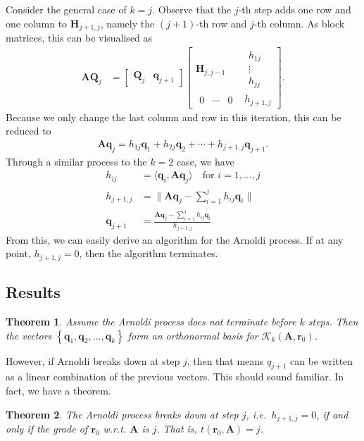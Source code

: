 \documentclass[12pt,a4paper]{article} %
\newtheorem*{theorem}{Theorem}
\begin{document}
Consider the general case of $k=j$. Observe that the $j$-th step adds 
one row and one column to $\mathbf H_{j+1,j}$, namely the $(j+1)$-th row and $j$-th 
column. As block matrices, this can be visualised as 
\begin{align*}
    \mathbf A \mathbf Q_j &= \begin{bmatrix}
        \mathbf Q_j & \bm q_{j+1}
    \end{bmatrix}
    \begin{bmatrix}
        \mathbf H_{j,j-1} & \begin{matrix}
            h_{1j} \\ \vdots \\ h_{jj}
        \end{matrix} \\ 
        \begin{matrix}
            0 & \cdots & 0
        \end{matrix} & h_{j+1,j}
    \end{bmatrix}.
\end{align*}
Because we only change the last column and row in this iteration, this can be reduced to 
\begin{align*}
    \mathbf A \bm q_j = h_{1j}\bm q_1 + h_{2j} \bm q_2 + \cdots + h_{j+1,j}\bm q_{j+1}.
\end{align*}
Through a similar process to the $k=2$ case, we have 
\begin{align*}
    h_{ij} &= \langle \bm q_i, \mathbf A\bm q_j \rangle \quad \text{for } i=1, \ldots, j \\ 
    h_{j+1,j} &= \| \mathbf A \bm q_j - \textstyle\sum_{i=1}^j h_{ij} \bm q_i \| \\ 
    \bm q_{j+1} &= \frac{\mathbf A \bm q_j - \sum_{i=1}^j h_{ij} \bm q_i }{h_{j+1,j}}
\end{align*}
From this, we can easily derive an algorithm for the Arnoldi process.
If at any point, $h_{j+1,j} = 0$, then the algorithm terminates. 

\subsection{Results}
\begin{theorem}
    Assume the Arnoldi process does not terminate before $k$ steps. Then the
vectors $\left\{\bm{q}_{1}, \bm{q}_{2}, \ldots, \bm{q}_{k}\right\}$ 
form an orthonormal basis for $\mathcal{K}_{k}\left(\mathbf{A}, \bm{r}_{0}\right)$.
\end{theorem}
However, if Arnoldi breaks down at step $j$, then that means $q_{j+1}$ can be written 
as a linear combination of the previous vectors. This should sound familiar. In fact,
we have a theorem.
\begin{theorem}
    The Arnoldi process breaks down at step $j$, i.e.\ $h_{j+1, j}=0$, if and only if the grade of $\bm{r}_{0}$
     w.r.t. $\mathbf{A}$ is $j$. That is, $t\left(\bm{r}_{0}, \bm{A}\right)=j$.
\end{theorem}
\end{document}
